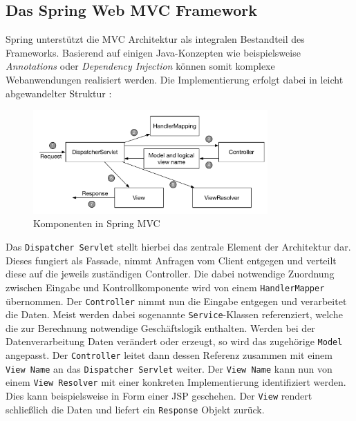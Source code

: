 \subsection{Das Spring Web MVC Framework}
Spring unterstützt die \acs{MVC} Architektur als integralen Bestandteil des Frameworks. Basierend auf einigen Java-Konzepten wie beispielsweise \textit{Annotations} oder \textit{Dependency Injection} können somit komplexe Webanwendungen realisiert werden. Die Implementierung erfolgt dabei in leicht abgewandelter Struktur \cite{walls:2011} : \\
\begin{figure}[bth] 
  \centering
  \includegraphics[width=0.8\textwidth]{Graphics/spring_mvc}
  \caption{Komponenten in Spring MVC}
\end{figure}
\newpage
Das \texttt{Dispatcher Servlet} stellt hierbei das zentrale Element der Architektur dar. Dieses fungiert als Fassade, nimmt Anfragen vom Client entgegen und verteilt diese auf die jeweils zuständigen Controller. Die dabei notwendige Zuordnung zwischen Eingabe und Kontrollkomponente wird von einem \texttt{HandlerMapper} übernommen. Der \texttt{Controller} nimmt nun die Eingabe entgegen und verarbeitet die Daten. Meist werden dabei sogenannte \texttt{Service}-Klassen referenziert, welche die zur Berechnung notwendige Geschäftslogik enthalten. Werden bei der Datenverarbeitung Daten verändert oder erzeugt, so wird das zugehörige \texttt{Model} angepasst. Der \texttt{Controller} leitet dann dessen Referenz zusammen mit einem \texttt{View Name} an das \texttt{Dispatcher Servlet} weiter. Der \texttt{View Name} kann nun von einem \texttt{View Resolver} mit einer konkreten Implementierung identifiziert werden. Dies kann beispielsweise in Form einer \acs{JSP} geschehen. Der \texttt{View} rendert schließlich die Daten und liefert ein \texttt{Response} Objekt zurück.\\\\

